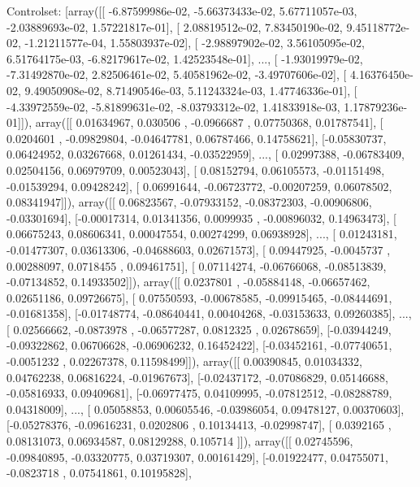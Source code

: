 \documentclass{article}
\begin{document}
Controlset: [array([[ -6.87599986e-02,  -5.66373433e-02,   5.67711057e-03,
         -2.03889693e-02,   1.57221817e-01],
       [  2.08819512e-02,   7.83450190e-02,   9.45118772e-02,
         -1.21211577e-04,   1.55803937e-02],
       [ -2.98897902e-02,   3.56105095e-02,   6.51764175e-03,
         -6.82179617e-02,   1.42523548e-01],
       ..., 
       [ -1.93019979e-02,  -7.31492870e-02,   2.82506461e-02,
          5.40581962e-02,  -3.49707606e-02],
       [  4.16376450e-02,   9.49050908e-02,   8.71490546e-03,
          5.11243324e-03,   1.47746336e-01],
       [ -4.33972559e-02,  -5.81899631e-02,  -8.03793312e-02,
          1.41833918e-03,   1.17879236e-01]]), array([[ 0.01634967,  0.030506  , -0.0966687 ,  0.07750368,  0.01787541],
       [ 0.0204601 , -0.09829804, -0.04647781,  0.06787466,  0.14758621],
       [-0.05830737,  0.06424952,  0.03267668,  0.01261434, -0.03522959],
       ..., 
       [ 0.02997388, -0.06783409,  0.02504156,  0.06979709,  0.00523043],
       [ 0.08152794,  0.06105573, -0.01151498, -0.01539294,  0.09428242],
       [ 0.06991644, -0.06723772, -0.00207259,  0.06078502,  0.08341947]]), array([[ 0.06823567, -0.07933152, -0.08372303, -0.00906806, -0.03301694],
       [-0.00017314,  0.01341356,  0.0099935 , -0.00896032,  0.14963473],
       [ 0.06675243,  0.08606341,  0.00047554,  0.00274299,  0.06938928],
       ..., 
       [ 0.01243181, -0.01477307,  0.03613306, -0.04688603,  0.02671573],
       [ 0.09447925, -0.0045737 ,  0.00288097,  0.0718455 ,  0.09461751],
       [ 0.07114274, -0.06766068, -0.08513839, -0.07134852,  0.14933502]]), array([[ 0.0237801 , -0.05884148, -0.06657462,  0.02651186,  0.09726675],
       [ 0.07550593, -0.00678585, -0.09915465, -0.08444691, -0.01681358],
       [-0.01748774, -0.08640441,  0.00404268, -0.03153633,  0.09260385],
       ..., 
       [ 0.02566662, -0.0873978 , -0.06577287,  0.0812325 ,  0.02678659],
       [-0.03944249, -0.09322862,  0.06706628, -0.06906232,  0.16452422],
       [-0.03452161, -0.07740651, -0.0051232 ,  0.02267378,  0.11598499]]), array([[ 0.00390845,  0.01034332,  0.04762238,  0.06816224, -0.01967673],
       [-0.02437172, -0.07086829,  0.05146688, -0.05816933,  0.09409681],
       [-0.06977475,  0.04109995, -0.07812512, -0.08288789,  0.04318009],
       ..., 
       [ 0.05058853,  0.00605546, -0.03986054,  0.09478127,  0.00370603],
       [-0.05278376, -0.09616231,  0.0202806 ,  0.10134413, -0.02998747],
       [ 0.0392165 ,  0.08131073,  0.06934587,  0.08129288,  0.105714  ]]), array([[ 0.02745596, -0.09840895, -0.03320775,  0.03719307,  0.00161429],
       [-0.01922477,  0.04755071, -0.0823718 ,  0.07541861,  0.10195828],
\end{document}
